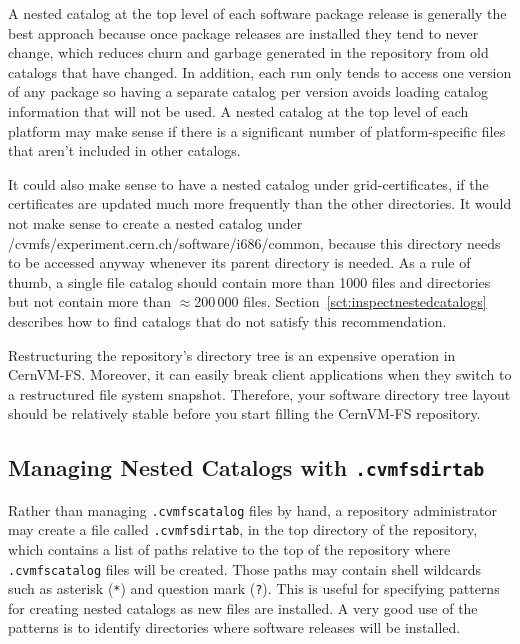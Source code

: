 A nested catalog at the top level of each software package release is generally the best approach because once package releases are installed they tend to never change, which reduces churn and garbage generated in the repository from old catalogs that have changed.
In addition, each run only tends to access one version of any package so having a separate catalog per version avoids loading catalog information that will not be used.
A nested catalog at the top level of each platform may make sense if there is a significant number of platform-specific files that aren't included in other catalogs.

It could also make sense to have a nested catalog under grid-certificates, if the certificates are updated much more frequently than the other directories.
It would not make sense to create a nested catalog under /cvmfs/experiment.cern.ch/software/i686/common, because this directory needs to be accessed anyway whenever its parent directory is needed.
As a rule of thumb, a single file catalog should contain more than 1000 files and directories but not contain more than $\approx$200\,000 files.
Section~\ref{sct:inspectnestedcatalogs} describes how to find catalogs that do not satisfy this recommendation.

Restructuring the repository's directory tree is an expensive operation in CernVM-FS.
Moreover, it can easily break client applications when they switch to a restructured file system snapshot.
Therefore, your software directory tree layout should be relatively stable before you start filling the CernVM-FS repository.

\subsection{Managing Nested Catalogs with \texttt{.cvmfsdirtab}}
Rather than managing \texttt{.cvmfscatalog} files by hand, a repository administrator may create a file called \texttt{.cvmfsdirtab}, in the top directory of the repository, which contains a list of paths relative to the top of the repository where \texttt{.cvmfscatalog} files will be created.
Those paths may contain shell wildcards such as asterisk (\texttt{*}) and question mark (\texttt{?}).
This is useful for specifying patterns for creating nested catalogs as new files are installed.
A very good use of the patterns is to identify directories where software releases will be installed.

